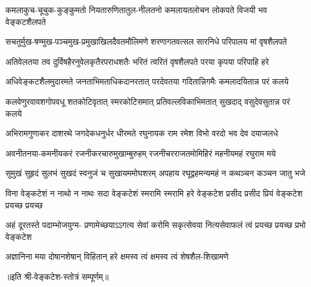 
\twolineshloka
{कमलाकुच-चूचुक-कुङ्कुमतो नियतारुणितातुल-नीलतनो}
{कमलायतलोचन लोकपते विजयी भव वेङ्कटशैलपते}

\twolineshloka
{सचतुर्मुख-षण्मुख-पञ्चमुख-प्रमुखाखिलदैवतमौलिमणे}
{शरणागतवत्सल सारनिधे परिपालय मां वृषशैलपते}

\twolineshloka
{अतिवेलतया तव दुर्विषहैरनुवेलकृतैरपराधशतैः}
{भरितं त्वरितं वृषशैलपते परया कृपया परिपाहि हरे}

\twolineshloka
{अधिवेङ्कटशैलमुदारमते जनताभिमताधिकदानरतात्}
{परदेवतया गदितान्निगमैः कमलादयितान्न परं कलये}

\twolineshloka
{कलवेणुरवावशगोपवधू शतकोटिवृतात् स्मरकोटिसमात्}
{प्रतिवल्लविकाभिमतात् सुखदाद् वसुदेवसुतान्न परं कलये}

\twolineshloka
{अभिरामगुणाकर दाशरथे जगदेकधनुर्धर धीरमते}
{रघुनायक राम रमेश विभो वरदो भव देव दयाजलधे}

\twolineshloka
{अवनीतनया-कमनीयकरं रजनीकरचारुमुखाम्बुरुहम्}
{रजनीचरराजतमोमिहिरं महनीयमहं रघुराम मये}

\twolineshloka
{सुमुखं सुहृदं सुलभं सुखदं स्वनुजं च सुखायममोघशरम्}
{अपहाय रघूद्वहमन्यमहं न कथञ्चन कञ्चन जातु भजे}

\fourlineindentedshloka
{विना वेङ्कटेशं न नाथो न नाथः}
{सदा वेङ्कटेशं स्मरामि स्मरामि}
{हरे वेङ्कटेश प्रसीद प्रसीद}
{प्रियं वेङ्कटेश प्रयच्छ प्रयच्छ}%

\fourlineindentedshloka
{अहं दूरतस्ते पदाम्भोजयुग्म-}
{प्रणामेच्छयाऽऽगत्य सेवां करोमि}
{सकृत्सेवया नित्यसेवाफलं त्वं}
{प्रयच्छ प्रयच्छ प्रभो वेङ्कटेश}

\twolineshloka
{अज्ञानिना मया दोषानशेषान् विहितान् हरे}
{क्षमस्व त्वं क्षमस्व त्वं शेषशैल-शिखामणे}

॥इति श्री-वेङ्कटेश-स्तोत्रं सम्पूर्णम्॥
